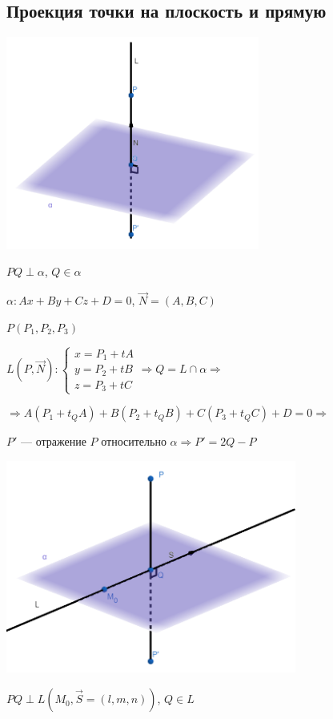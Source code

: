 \documentclass[twoside]{book}
\begin{document}
\subsection{Проекция точки на плоскость и прямую}
\begin{center}
    \includegraphics[height=7cm]{Images/Chapter_1/2-3-1.png}
\end{center}
\(PQ \perp \alpha\), \(Q \in \alpha\)

\(\alpha: Ax + By + Cz + D = 0\), \(\vec N = (A, B, C)\)

\(P(P_1, P_2, P_3)\)

\(L(P, \vec N):
\begin{cases}
    x = P_1 + t A \\
    y = P_2 + t B \\
    z = P_3 + t C
\end{cases} \Rightarrow Q = L \cap \alpha \Rightarrow\)

\(\Rightarrow A(P_1 + t_Q A) + B(P_2 + t_Q B) + C(P_3 + t_Q C) + D = 0 \Rightarrow\)

\(P'\) --- отражение \(P\) относительно \(\alpha \Rightarrow P' = 2Q - P\)
\begin{center}
    \includegraphics[height=7cm]{Images/Chapter_1/2-3-2.png}
\end{center}
\(PQ \perp L(M_0, \vec S = (l, m, n))\), \(Q \in L\)
\end{document}
